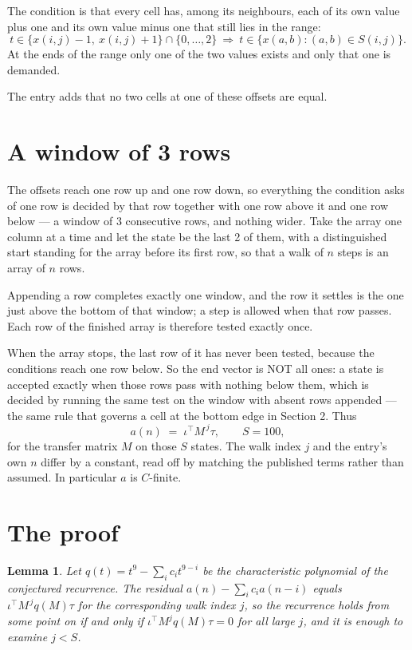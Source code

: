 \documentclass[11pt,a4paper]{article}
\theoremstyle{plain}
\newtheorem{lemma}[theorem]{Lemma}
\theoremstyle{definition}
\begin{document}
The condition is that every cell has, among its neighbours, each of its own value plus one and its own value minus one that still lies in the range:
\[
t\in\{x(i,j)-1,\ x(i,j)+1\}\cap\{0,\dots,2\}\ \Longrightarrow\ t\in\{x(a,b):(a,b)\in S(i,j)\}.
\]
At the ends of the range only one of the two values exists and only that one is demanded.

The entry adds that no two cells at one of these offsets are equal.

\section{A window of 3 rows}

The offsets reach one row up and one row down, so everything the condition asks of one row is
decided by that row together with one row above it and one row below --- a window of
$3$ consecutive rows, and nothing wider. Take the array one column at a time and
let the state be the last 2 of them, with a distinguished start standing for the array before its
first row, so that a walk of $n$ steps is an array of $n$ rows.

Appending a row completes exactly one window, and the row it settles is the one just above the bottom of that window; a step is
allowed when that row passes. Each row of the finished array is therefore tested exactly once.

When the array stops, the last row of it has never been tested, because the
conditions reach one row below. So the end vector is NOT all ones: a state is accepted exactly when
those rows pass with nothing below them, which is decided by running the same test on the window
with absent rows appended --- the same rule that governs a cell at the bottom edge in
Section 2.
Thus
\[
a(n)\;=\;\iota^{\!\top}M^{\,j}\tau ,\qquad S=100,
\]
for the transfer matrix $M$ on those $S$ states. The walk index $j$ and the entry's own $n$
differ by a constant, read off by matching the published terms rather than assumed. In
particular $a$ is $C$-finite.

\section{The proof}

\begin{lemma}\label{lem:crit}
Let $q(t)=t^{9}-\sum_i c_it^{9-i}$ be the characteristic polynomial of the
conjectured recurrence. The residual $a(n)-\sum_ic_ia(n-i)$ equals
$\iota^{\!\top}M^{\,j}q(M)\tau$ for the corresponding walk index $j$, so the recurrence
holds from some point on if and only if $\iota^{\!\top}M^{j}q(M)\tau=0$ for all large $j$,
and it is enough to examine $j<S$.
\end{lemma}
\end{document}
